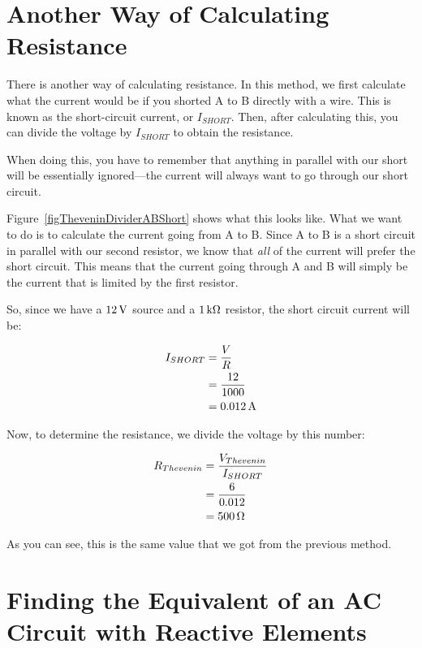 \section{Another Way of Calculating \thev Resistance}

There is another way of calculating \thev resistance.  
In this method, we first calculate what the current would be if you shorted A to B directly with a wire.
This is known as the short-circuit current, or $I_{SHORT}$.
Then, after calculating this, you can divide the \thev voltage by $I_{SHORT}$ to obtain the \thev resistance.

When doing this, you have to remember that anything in parallel with our short will be essentially ignored---the current will always want to go through our short circuit.


Figure~\ref{figTheveninDividerABShort} shows what this looks like.
What we want to do is to calculate the current going from A to B.
Since A to B is a short circuit in parallel with our second resistor, we know that \emph{all} of the current will prefer the short circuit.
This means that the current going through A and B will simply be the current that is limited by the first resistor.

So, since we have a $12\,\si{\volt}$ source and a $1\,\si{\kilo\ohm}$ resistor, the short circuit current will be:

\begin{align*}
I_{SHORT} &= \frac{V}{R} \\
          &= \frac{12}{1000} \\
          &= 0.012\,\si{\ampere}
\end{align*}

Now, to determine the \thev resistance, we divide the \thev voltage by this number:

\begin{align*}
R_{Thevenin} &= \frac{V_{Thevenin}}{I_{SHORT}} \\
  &= \frac{6}{0.012} \\
  &= 500\,\si{\ohm}
\end{align*}

As you can see, this is the same value that we got from the previous method.

\section{Finding the \thev Equivalent of an AC Circuit with Reactive Elements}

